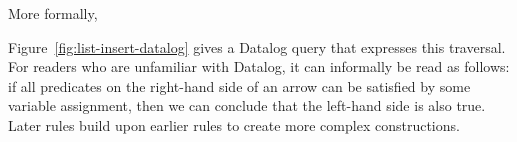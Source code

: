\begin{figure*}
\begin{align*}

\end{align*}
\caption{Datalog rules for an ordered list (insertion only).}\label{fig:list-insert-datalog}
\end{figure*}

\begin{figure*}
\begin{align*}

\end{align*}
\caption{Datalog rules for assignment of map keys and list elements.}\label{fig:assignment-datalog}
\end{figure*}

More formally, 

Figure~\ref{fig:list-insert-datalog} gives a Datalog query that expresses this traversal.
For readers who are unfamiliar with Datalog, it can informally be read as follows: if all predicates on the right-hand side of an arrow can be satisfied by some variable assignment, then we can conclude that the left-hand side is also true.
Later rules build upon earlier rules to create more complex constructions.
